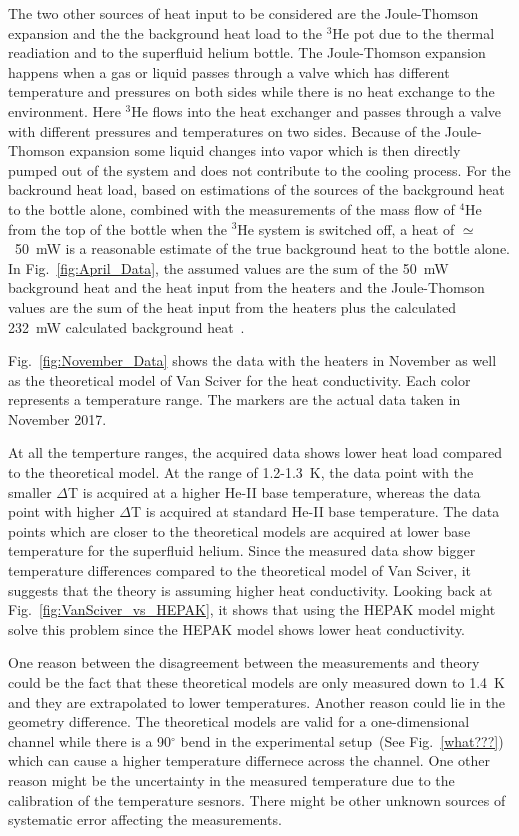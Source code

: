 The two other sources of heat input to be considered are the
Joule-Thomson expansion and the the background heat load to the $^3$He
pot due to the thermal readiation and to the superfluid helium
bottle. The Joule-Thomson expansion happens when a gas or liquid
passes through a valve which has different temperature and pressures
on both sides while there is no heat exchange to the environment. Here
$^3$He flows into the heat exchanger and passes through a valve with
different pressures and temperatures on two sides. Because of the
Joule-Thomson expansion some liquid changes into vapor which is then
directly pumped out of the system and does not contribute to the
cooling process. For the backround heat load, based on estimations of
the sources of the background heat to the bottle alone, combined with
the measurements of the mass flow of $^4$He from the top of the bottle
when the $^3$He system is switched off, a heat of $\simeq$~50~mW is a
reasonable estimate of the true background heat to the bottle
alone. In Fig.~\ref{fig:April_Data}, the assumed values are the sum of
the 50~mW background heat and the heat input from the heaters and the
Joule-Thomson values are the sum of the heat input from the heaters
plus the calculated 232~mW calculated background
heat~\cite{Florian_thesis}.



Fig.~\ref{fig:November_Data} shows the data with the heaters in
November as well as the theoretical model of Van Sciver for the heat
conductivity. Each color represents a temperature range. The markers
are the actual data taken in November 2017.

At all the temperture ranges, the acquired data shows lower heat load
compared to the theoretical model. At the range of 1.2-1.3~K, the data
point with the smaller $\Delta$T is acquired at a higher He-II base
temperature, whereas the data point with higher $\Delta$T is acquired
at standard He-II base temperature. The data points which are closer
to the theoretical models are acquired at lower base temperature for
the superfluid helium. Since the measured data show bigger temperature
differences compared to the theoretical model of Van Sciver, it
suggests that the theory is assuming higher heat conductivity. Looking
back at Fig.~\ref{fig:VanSciver_vs_HEPAK}, it shows that using the
HEPAK model might solve this problem since the HEPAK model shows lower
heat conductivity.

One reason between the disagreement between the measurements and
theory could be the fact that these theoretical models are only
measured down to 1.4~K and they are extrapolated to lower
temperatures. Another reason could lie in the geometry difference. The
theoretical models are valid for a one-dimensional channel while there
is a 90$^\circ$ bend in the experimental setup~(See
Fig.~\ref{what???}) which can cause a higher temperature differnece
across the channel. One other reason might be the uncertainty in the
measured temperature due to the calibration of the temperature
sesnors. There might be other unknown sources of systematic error
affecting the measurements.


